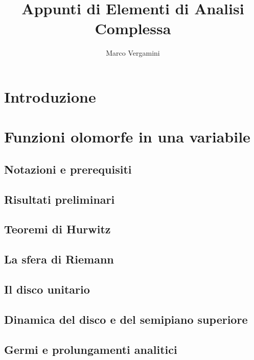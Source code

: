 \documentclass{article}
\title{Appunti di Elementi di Analisi Complessa}
\date{}
\author{Marco Vergamini}
\begin{document}
\maketitle
\newpage
\tableofcontents
\newpage


\section{Introduzione}


\newpage

\section{Funzioni olomorfe in una variabile}

\subsection{Notazioni e prerequisiti}


\subsection{Risultati preliminari}


\subsection{Teoremi di Hurwitz}


\subsection{La sfera di Riemann}


\subsection{Il disco unitario}


\subsection{Dinamica del disco e del semipiano superiore}


\subsection{Germi e prolungamenti analitici}

\end{document}
